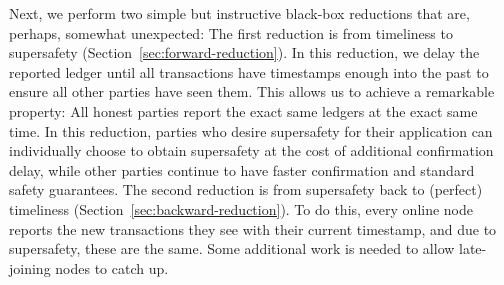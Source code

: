 Next, we perform two simple but instructive black-box reductions that are, perhaps, somewhat unexpected:
The first reduction is from timeliness to supersafety (Section~\ref{sec:forward-reduction}).
In this reduction, we delay the reported ledger until all
transactions have timestamps enough into the past to ensure all other parties have seen them.
This allows us to achieve a remarkable property: All honest parties report the
exact same ledgers at the exact same time.
In this reduction, parties who desire supersafety for their application can individually choose to obtain supersafety at the cost of additional confirmation delay, while other parties continue to have faster confirmation and standard safety guarantees. 
The second reduction is from supersafety back to (perfect) timeliness (Section~\ref{sec:backward-reduction}).
To do this, every online node reports the new transactions they see with
their current timestamp, and due to supersafety, these are the same.
Some additional work is needed to allow late-joining nodes to catch up.

